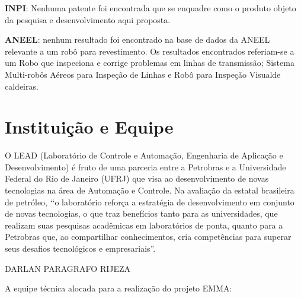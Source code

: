 \textbf{INPI}: Nenhuma patente foi encontrada que se enquadre como o produto
objeto da pesquisa e desenvolvimento aqui proposta.

\textbf{ANEEL}: nenhum resultado foi encontrado na base de dados da ANEEL
relevante a um robô para revestimento. Os resultados encontrados referiam-se a
um Robo que inspeciona e corrige problemas em linhas de transmissão; Sistema
Multi-robôs Aéreos para Inspeção de Linhas e Robô para Inspeção Visualde
caldeiras.

\section{Instituição e Equipe}

O LEAD (Laboratório de Controle e Automação, Engenharia de Aplicação e
Desenvolvimento) é fruto de uma parceria entre a Petrobras e a Universidade
Federal do Rio de Janeiro (UFRJ) que visa ao desenvolvimento de novas
tecnologias na área de Automação e Controle.
Na avaliação da estatal brasileira de petróleo, ‘‘o laboratório reforça a
estratégia de desenvolvimento em conjunto de novas tecnologias, o que traz
benefícios tanto para as universidades, que realizam suas pesquisas acadêmicas
em laboratórios de ponta, quanto para a Petrobras que, ao compartilhar
conhecimentos, cria competências para superar seus desafios tecnológicos e
empresariais”.

DARLAN PARAGRAFO RIJEZA


A equipe técnica alocada para a realização do projeto EMMA:

